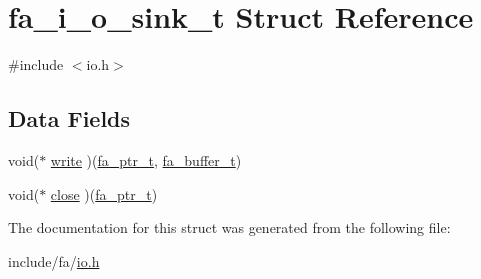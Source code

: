 \hypertarget{structfa__i__o__sink__t}{\section{fa\-\_\-i\-\_\-o\-\_\-sink\-\_\-t Struct Reference}
\label{structfa__i__o__sink__t}
}


{\ttfamily \#include $<$io.\-h$>$}

\subsection*{Data Fields}
\begin{DoxyCompactItemize}
\item 
void($\ast$ \hyperlink{group___fa_ga9559f8ccaa3356246a5787b9a5ee5f81}{write} )(\hyperlink{group___fa_ga915ddeae99ad7568b273d2b876425197}{fa\-\_\-ptr\-\_\-t}, \hyperlink{group___fa_buffer_ga0ed7a1d783ab322e2e8be02432d0839e}{fa\-\_\-buffer\-\_\-t})
\item 
void($\ast$ \hyperlink{group___fa_gab23b99403163001c7d1e318f0812590a}{close} )(\hyperlink{group___fa_ga915ddeae99ad7568b273d2b876425197}{fa\-\_\-ptr\-\_\-t})
\end{DoxyCompactItemize}


The documentation for this struct was generated from the following file\-:\begin{DoxyCompactItemize}
\item 
include/fa/\hyperlink{io_8h}{io.\-h}\end{DoxyCompactItemize}
